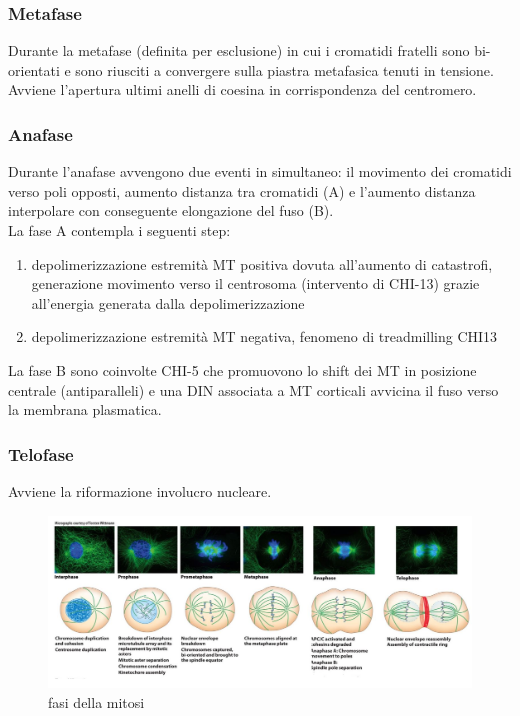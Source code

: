         \subsubsection{Metafase}
            Durante la metafase (definita per esclusione) in cui i cromatidi fratelli sono bi-orientati e sono riusciti a convergere sulla piastra metafasica tenuti in tensione.\\ Avviene l'apertura ultimi anelli di coesina in corrispondenza del centromero.

        \subsubsection{Anafase}
            Durante l'anafase avvengono due eventi in simultaneo: il movimento dei cromatidi verso poli opposti, aumento distanza tra cromatidi (A) e l'aumento distanza interpolare con conseguente elongazione del fuso (B).\\
            La fase A contempla i seguenti step: 
            \begin{enumerate}
                \item depolimerizzazione estremità MT positiva dovuta all’aumento di catastrofi, generazione movimento verso il centrosoma (intervento di CHI-13) grazie all’energia generata dalla depolimerizzazione
                \item depolimerizzazione estremità MT negativa, fenomeno di treadmilling CHI13
            \end{enumerate}
            La fase B sono coinvolte CHI-5 che promuovono lo shift dei MT in posizione centrale (antiparalleli) e una DIN associata a MT corticali avvicina il fuso verso la membrana plasmatica.

        \subsubsection{Telofase}
            Avviene la riformazione involucro nucleare.
            
            \begin{figure}[h]
                \centering
                \includegraphics[width=1\textwidth]{images/mitosi.JPG}
                \caption{\small fasi della mitosi}
                \label{fig:mesh1}
            \end{figure}
            
